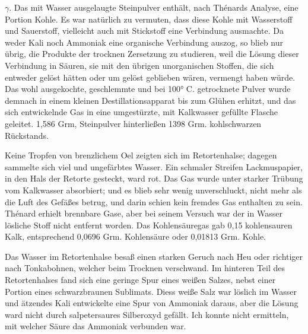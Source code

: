 \documentclass[a4paper, 11pt, oneside]{article}
\begin{document}
$\gamma$. Das mit Wasser ausgelaugte Steinpulver enthält, nach Thénards Analyse, eine Portion Kohle. Es war natürlich zu vermuten, dass diese Kohle mit Wasserstoff und Sauerstoff, vielleicht auch mit Stickstoff eine Verbindung ausmachte. Da weder Kali noch Ammoniak eine organische Verbindung auszog, so blieb nur übrig, die Produkte der trocknen Zersetzung zu studieren, weil die Lösung dieser Verbindung in Säuren, sie mit den übrigen unorganischen Stoffen, die sich entweder gelöst hätten oder um gelöst geblieben wären, vermengt haben würde. Das wohl ausgekochte, geschlemmte und bei 100° C. getrocknete Pulver wurde demnach in einem kleinen Destillationsapparat bis zum Glühen erhitzt, und das sich entwickelnde Gas in eine umgestürzte, mit Kalkwasser gefüllte Flasche geleitet. 1,586 Grm, Steinpulver hinterließen 1398 Grm. kohlschwarzen Rückstands.

Keine Tropfen von brenzlichem Oel zeigten sich im Retortenhalse; dagegen sammelte sich viel und ungefärbtes Wasser. Ein schmaler Streifen Lackmuspapier, in den Hals der Retorte gesteckt, ward rot. Das Gas wurde unter starker Trübung vom Kalkwasser absorbiert; und es blieb sehr wenig unverschluckt, nicht mehr als die Luft des Gefäßes betrug, und darin schien kein fremdes Gas enthalten zu sein. Thénard erhielt brennbare Gase, aber bei seinem Versuch war der in Wasser lösliche Stoff nicht entfernt worden. Das Kohlensäuregas gab 0,15 kohlensauren Kalk, entsprechend 0,0696 Grm. Kohlensäure oder 0,01813 Grm. Kohle.

Das Wasser im Retortenhalse besaß einen starken Geruch nach Heu oder richtiger nach Tonkabohnen, welcher beim Trocknen verschwand. Im hinteren Teil des Retortenhalses fand sich eine geringe Spur eines weißen Salzes, nebst einer Portion eines schwarzbraunen Sublimats. Diess weiße Salz war löslich im Wasser und ätzendes Kali entwickelte eine Spur von Ammoniak daraus, aber die Lösung ward nicht durch salpetersaures Silberoxyd gefällt. Ich konnte nicht ermitteln, mit welcher Säure das Ammoniak verbunden war.
\end{document}
